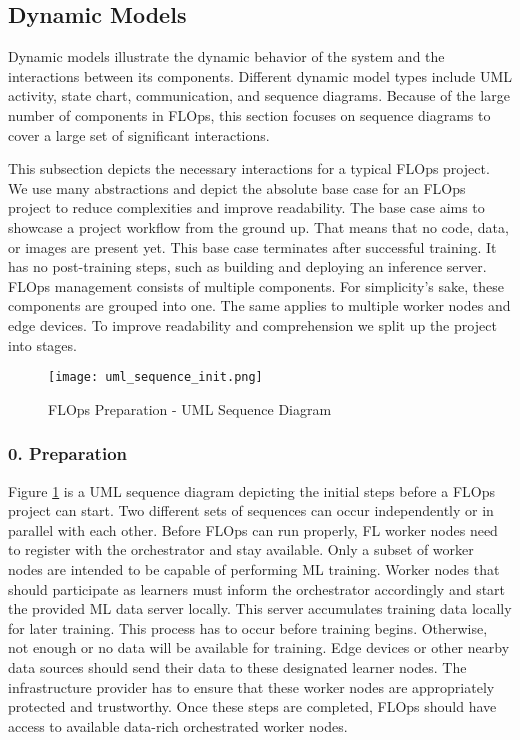 \subsection{Dynamic Models}
Dynamic models illustrate the dynamic behavior of the system and the interactions between its components.
Different dynamic model types include UML activity, state chart, communication, and sequence diagrams.
Because of the large number of components in FLOps, this section focuses on sequence diagrams to cover a large set of significant interactions.

This subsection depicts the necessary interactions for a typical FLOps project.
We use many abstractions and depict the absolute base case for an FLOps project to reduce complexities and improve readability.
The base case aims to showcase a project workflow from the ground up.
That means that no code, data, or images are present yet.
This base case terminates after successful training.
It has no post-training steps, such as building and deploying an inference server.
FLOps management consists of multiple components.
For simplicity's sake, these components are grouped into one. 
The same applies to multiple worker nodes and edge devices.
To improve readability and comprehension we split up the project into stages.

\begin{figure}[h]
    \begin{adjustwidth}{-0.1\paperwidth}{-0.1\paperwidth}
        \centering
        \texttt{[image: uml\_sequence\_init.png]}
        \caption{FLOps Preparation - UML Sequence Diagram}
        \label{fig:uml_sequence_init}
    \end{adjustwidth}
\end{figure}

\pagebreak
\subsubsection{0. Preparation}
Figure \ref{fig:uml_sequence_init} is a UML sequence diagram depicting the initial steps before a FLOps project can start.
Two different sets of sequences can occur independently or in parallel with each other.
Before FLOps can run properly, FL worker nodes need to register with the orchestrator and stay available.
Only a subset of worker nodes are intended to be capable of performing ML training.
Worker nodes that should participate as learners must inform the orchestrator accordingly and start the provided ML data server locally.
This server accumulates training data locally for later training.
This process has to occur before training begins.
Otherwise, not enough or no data will be available for training.
Edge devices or other nearby data sources should send their data to these designated learner nodes.
The infrastructure provider has to ensure that these worker nodes are appropriately protected and trustworthy.
Once these steps are completed, FLOps should have access to available data-rich orchestrated worker nodes.

